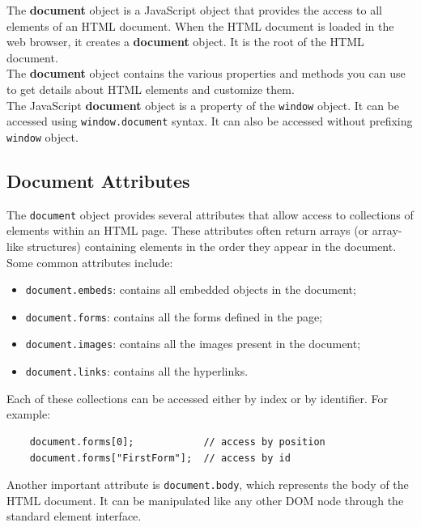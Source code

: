 \documentclass{scrbook}
\begin{document}
	The \textbf{document} object is a JavaScript object that provides the access to all elements of an HTML document. When the HTML document is loaded in the web browser, it creates a \textbf{document} object. It is the root of the HTML document.\\
	
	The \textbf{document} object contains the various properties and methods you can use to get details about HTML elements and customize them.\\
	
	The JavaScript \textbf{document} object is a property of the \texttt{window} object. It can be accessed using \texttt{window.document} syntax. It can also be accessed without prefixing \texttt{window} object.
	
	\subsection{Document Attributes}
	
	The \texttt{document} object provides several attributes that allow access to collections of elements within an HTML page. These attributes often return arrays (or array-like structures) containing elements in the order they appear in the document.\\
	
	Some common attributes include:
	
	\begin{itemize}
		\item \texttt{document.embeds}: contains all embedded objects in the document;
		
		\item \texttt{document.forms}: contains all the forms defined in the page;
		
		\item \texttt{document.images}: contains all the images present in the document;
		
		\item \texttt{document.links}: contains all the hyperlinks.
	\end{itemize}
	
	Each of these collections can be accessed either by index or by identifier. For example:
	
	\begin{lstlisting}
	document.forms[0];            // access by position
	document.forms["FirstForm"];  // access by id
	\end{lstlisting}
	
	Another important attribute is \texttt{document.body}, which represents the body of the HTML document. It can be manipulated like any other DOM node through the standard element interface.\\
	
\end{document}
